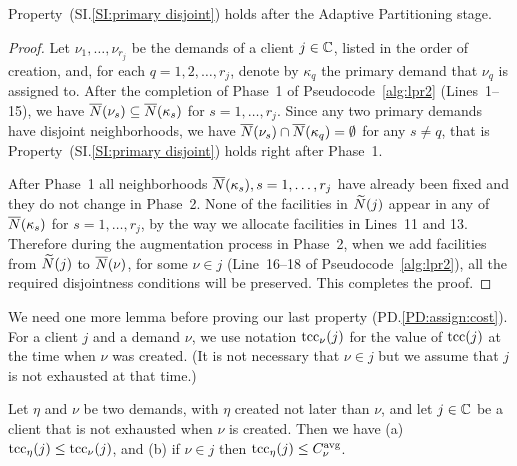 \documentclass{llncs}
\begin{document}
\begin{lemma}\label{lem: property SI:primary disjoint holds}
  Property~(SI.\ref{SI:primary disjoint}) holds after the
  Adaptive Partitioning stage.
\end{lemma}
\begin{proof}
  Let $\nu_1,\ldots,\nu_{r_j}$ be the demands of a client
  $j\in\mathbb{C}$, listed in the order of creation, and, for each
  $q=1,2,\ldots,r_j$, denote by $\kappa_q$ the primary demand that
  $\nu_q$ is assigned to. After the completion of Phase~1 of
  Pseudocode~\ref{alg:lpr2} (Lines~1--15), we have
  ${\overline{N}}(\nu_s)\subseteq {\overline{N}}(\kappa_s)$ for  $s=1,\ldots,r_j$. 
Since any two primary demands have disjoint
  neighborhoods, we have ${\overline{N}}(\nu_s) \cap {\overline{N}}(\kappa_q) =
  \emptyset$ for any $s\neq q$, that is
	Property~(SI.\ref{SI:primary disjoint}) holds right after Phase~1.

        After Phase~1 all neighborhoods ${\overline{N}}(\kappa_s),
        s=1,\ldots,r_j$ have already been fixed and they do not change
        in Phase~2.  None of the facilities in ${\widetilde N}(j)$ appear in
        any of ${\overline{N}}(\kappa_s)$ for $s=1,\ldots,r_j$, by the way we
        allocate facilities in Lines~11 and 13.  Therefore during the
        augmentation process in Phase~2, when we add facilities from
        ${\widetilde N}(j)$ to ${\overline{N}}(\nu)$, for some $\nu\in j$
        (Line~16--18 of Pseudocode~\ref{alg:lpr2}), all the required
        disjointness conditions will be preserved. This completes the proof.
\end{proof}


We need one more lemma before proving our last property
(PD.\ref{PD:assign:cost}).  For a client $j$ and a demand
$\nu$, we use notation $\textrm{tcc}_{\nu}(j)$ for the value of
$\textrm{tcc}(j)$ at the time when $\nu$ was created. (It is not
necessary that $\nu\in j$ but we assume that $j$ is not
exhausted at that time.)


\begin{lemma}\label{lem: tcc optimal}
  Let $\eta$ and $\nu$ be two demands, with $\eta$ created not later
  than $\nu$, and let $j\in\mathbb{C}$ be a client that is not
  exhausted when $\nu$ is created. Then we have (a) $\textrm{tcc}_\eta(j) \le
  \textrm{tcc}_{\nu}(j)$, and (b) if $\nu\in j$ then $\textrm{tcc}_\eta(j) \le
  C^{{\mbox{\scriptsize\rm avg}}}_{\nu}$.

\end{lemma}
\end{document}
